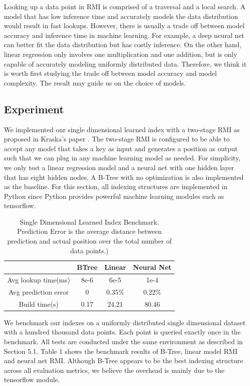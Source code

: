 \documentclass[sigconf,10pt]{acmart}
\begin{document}
Looking up a data point in RMI is comprised of a traversal and a local search. 
A model that has low inference time and accurately models the data distribution would result in fast lookups.
However, there is usually a trade off between model accuracy and inference time in machine learning. 
For example, a deep neural net can better fit the data distribution but has costly inference.
On the other hand, linear regression only involves one multiplication and one addition, but is only capable of 
accurately modeling uniformly distributed data.
Therefore, we think it is worth first studying the trade off between model accuracy and model
complexity. The result may guide us on the choice of models. 

\subsection{Experiment}

We implemented our single dimensional learned index with a two-stage RMI as proposed in 
Kraska's paper \cite{Learned_Index}. The two-stage RMI is configured to be able to accept
any model that takes a key as input and generates a position as output such that we can
plug in any machine learning model as needed. For simplicity, we only test a linear regression
model and a neural net with one hidden layer that has eight hidden nodes. 
A B-Tree with no optimization is also implemented as the baseline. 
For this section, all indexing structures are implemented in Python 
since Python provides powerful machine learning modules such as tensorflow. 

\begin{table}
  \centering
  \begin{tabular}{|c|c|c|c|}
    \hline
     & BTree & Linear & Neural Net \\
    \hline
    Avg lookup time(ms) & 8e-6 & 6e-5 & 1e-4 \\
    \hline 
    Avg prediction error & 0 & 0.35\% & 0.22\% \\
    \hline 
    Build time(s) & 0.17 & 24.21 & 80.46 \\
    \hline 
  \end{tabular}
  \caption{Single Dimensional Learned Index Benchmark. 
  Prediction Error is the average distance between prediction and actual position over the total number of data points.)}
  \label{table:single-dimensional-learned-index-benchmark}
\end{table}

We benchmark our indexes on a uniformly distributed single dimensional
dataset with a hundred thousand data points. Each point is queried exactly once in the benchmark.
All tests are conducted under the same environment as described in Section 5.1. Table 1 shows
the benchmark results of B-Tree, linear model RMI and neural net RMI. Although
B-Tree appears to be the best indexing structure across all evaluation metrics, we believe the
overhead is mainly due to the tensorflow module.
\end{document}
